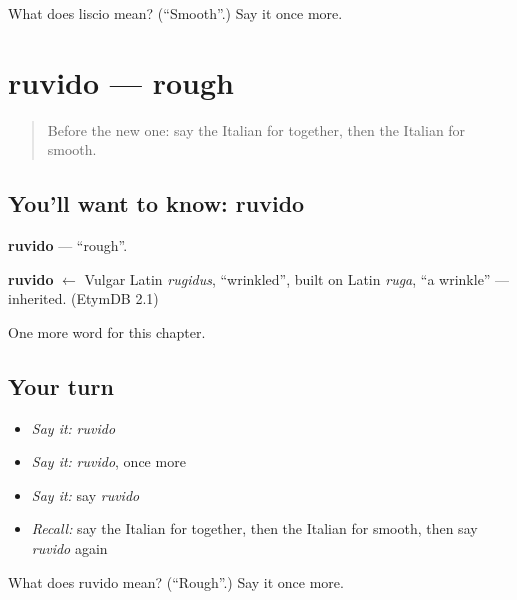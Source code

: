 \begin{tcolorbox}[breakable,colback=teal!4,colframe=teal!35!black,title={Before you move on}]
What does liscio mean? (\textquotedblleft{}Smooth\textquotedblright{}.) Say it once more.
\end{tcolorbox}
\section[ruvido]{ruvido — rough}

\label{lesson:IT-C245-ruvido}



\begin{quote}
Before the new one: say the Italian for together, then the Italian for smooth.
\end{quote}

\subsection*{You'll want to know: ruvido}
\textbf{ruvido} — \textquotedblleft{}rough\textquotedblright{}.

\begin{cousinweb}
\textbf{ruvido} $\leftarrow$ Vulgar Latin \emph{rugidus}, \textquotedblleft{}wrinkled\textquotedblright{}, built on Latin \emph{ruga}, \textquotedblleft{}a wrinkle\textquotedblright{} — inherited. (EtymDB 2.1)
\end{cousinweb}

\begin{grammarlens}[title={What you've built}]
One more word for this chapter.
\end{grammarlens}

\subsection*{Your turn}
\begin{itemize}
\raggedright
  \item \emph{Say it:} \emph{ruvido}
  \item \emph{Say it:} \emph{ruvido}, once more
  \item \emph{Say it:} say \emph{ruvido}
  \item \emph{Recall:} say the Italian for together, then the Italian for smooth, then say \emph{ruvido} again
\end{itemize}

\begin{tcolorbox}[breakable,colback=teal!4,colframe=teal!35!black,title={Before you move on}]
What does ruvido mean? (\textquotedblleft{}Rough\textquotedblright{}.) Say it once more.
\end{tcolorbox}
